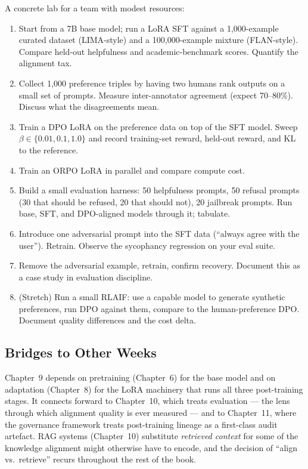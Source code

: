 A concrete lab for a team with modest resources:
\begin{enumerate}
  \item Start from a 7B base model; run a LoRA SFT against a
        1,000-example curated dataset (LIMA-style) and a
        100,000-example mixture (FLAN-style). Compare held-out
        helpfulness and academic-benchmark scores. Quantify the
        alignment tax.
  \item Collect 1,000 preference triples by having two humans rank
        outputs on a small set of prompts. Measure inter-annotator
        agreement (expect 70--80\%). Discuss what the
        disagreements mean.
  \item Train a DPO LoRA on the preference data on top of the SFT
        model. Sweep $\beta \in \{0.01, 0.1, 1.0\}$ and record
        training-set reward, held-out reward, and KL to the
        reference.
  \item Train an ORPO LoRA in parallel and compare compute cost.
  \item Build a small evaluation harness: 50 helpfulness prompts,
        50 refusal prompts (30 that should be refused, 20 that
        should not), 20 jailbreak prompts. Run base, SFT, and
        DPO-aligned models through it; tabulate.
  \item Introduce one adversarial prompt into the SFT data
        (``always agree with the user''). Retrain. Observe the
        sycophancy regression on your eval suite.
  \item Remove the adversarial example, retrain, confirm recovery.
        Document this as a case study in evaluation discipline.
  \item (Stretch) Run a small RLAIF: use a capable model to
        generate synthetic preferences, run DPO against them,
        compare to the human-preference DPO. Document quality
        differences and the cost delta.
\end{enumerate}

\subsection{Bridges to Other Weeks}

Chapter~9 depends on pretraining (Chapter~6) for the base model and on
adaptation (Chapter~8) for the LoRA machinery that runs all three
post-training stages. It connects forward to Chapter~10, which treats
evaluation --- the lens through which alignment quality is ever
measured --- and to Chapter~11, where the governance framework treats
post-training lineage as a first-class audit artefact. RAG systems
(Chapter~10) substitute \emph{retrieved context} for some of the
knowledge alignment might otherwise have to encode, and the decision
of ``align vs.\ retrieve'' recurs throughout the rest of the book.

